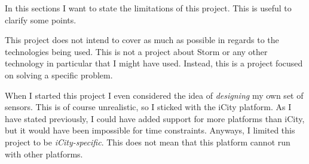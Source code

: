 In this sections I want to state the limitations of this project. This is
useful to clarify some points.

This project does not intend to cover as much as possible in regards to the
technologies being used. This is not a project about Storm or any
other technology in particular that I might have used. Instead, this is a
project focused on solving a specific problem.

When I started this project I even considered the idea of {\it designing} my
own set of sensors. This is of course unrealistic, so I sticked with the iCity
platform. As I have stated previously, I could have added support for more
platforms than iCity, but it would have been impossible for time constraints.
Anyways, I limited this project to be {\it iCity-specific}. This does not mean
that this platform cannot run with other platforms.

